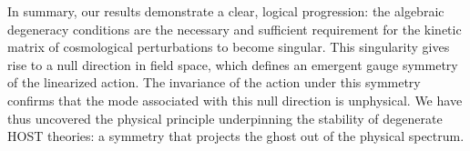 \documentclass[twocolumn]{aastex631}
\begin{document}
In summary, our results demonstrate a clear, logical progression: the algebraic degeneracy conditions are the necessary and sufficient requirement for the kinetic matrix of cosmological perturbations to become singular. This singularity gives rise to a null direction in field space, which defines an emergent gauge symmetry of the linearized action. The invariance of the action under this symmetry confirms that the mode associated with this null direction is unphysical. We have thus uncovered the physical principle underpinning the stability of degenerate HOST theories: a symmetry that projects the ghost out of the physical spectrum.
\end{document}
